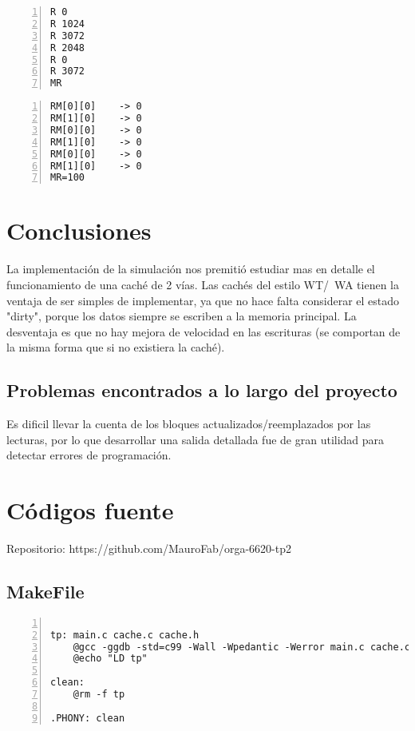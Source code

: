 \documentclass[11pt,a4paper, spanish]{article}
\begin{document}
\begin{lstlisting}[numbers=left, tabsize=2, basicstyle=\fontsize{11}{13}\ttfamily, frame=single, caption={prueba5.mem}]
R 0
R 1024
R 3072
R 2048
R 0
R 3072
MR
\end{lstlisting}

\begin{lstlisting}[numbers=left, tabsize=2, basicstyle=\fontsize{11}{13}\ttfamily, frame=single, caption={Resultado prueba5.mem}]
RM[0][0]    -> 0
RM[1][0]    -> 0
RM[0][0]    -> 0
RM[1][0]    -> 0
RM[0][0]    -> 0
RM[1][0]    -> 0
MR=100
\end{lstlisting}

\section{Conclusiones}

La implementación de la simulación nos premitió estudiar mas en detalle el funcionamiento de una caché de 2 vías. Las cachés
del estilo WT/~WA tienen la ventaja de ser simples de implementar, ya que no hace falta considerar el estado "dirty",
porque los datos siempre se escriben a la memoria principal. La desventaja es que no hay mejora de velocidad en las
escrituras (se comportan de la misma forma que si no existiera la caché).


\subsection{Problemas encontrados a lo largo del proyecto}

Es dificil llevar la cuenta de los bloques actualizados/reemplazados por las lecturas, por lo que desarrollar
una salida detallada fue de gran utilidad para detectar errores de programación.



\newpage

\section{C\'odigos fuente}

Repositorio: https://github.com/MauroFab/orga-6620-tp2

\subsection{MakeFile}

\begin{lstlisting}[numbers=left, tabsize=2, basicstyle=\fontsize{11}{13}\ttfamily, frame=single, caption={makefile}]

tp: main.c cache.c cache.h
	@gcc -ggdb -std=c99 -Wall -Wpedantic -Werror main.c cache.c -o tp -lm
	@echo "LD tp"

clean:
	@rm -f tp

.PHONY: clean

\end{lstlisting}
\end{document}
